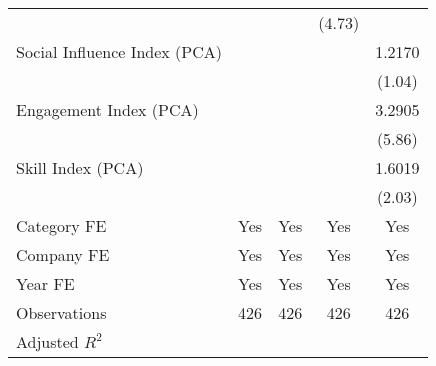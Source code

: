 {\begin{tabular}{l*{4}{c}}
                                   &                     &                     &      (4.73)         &                     \\
[1em]
Social Influence Index (PCA)       &                     &                     &                     &      1.2170         \\
                                   &                     &                     &                     &      (1.04)         \\
[1em]
Engagement Index (PCA)             &                     &                     &                     &      3.2905\sym{***}\\
                                   &                     &                     &                     &      (5.86)         \\
[1em]
Skill Index (PCA)                  &                     &                     &                     &      1.6019\sym{**} \\
                                   &                     &                     &                     &      (2.03)         \\
[1em]
Category FE                        &         Yes         &         Yes         &         Yes         &         Yes         \\
[1em]
Company FE                         &         Yes         &         Yes         &         Yes         &         Yes         \\
[1em]
Year FE                            &         Yes         &         Yes         &         Yes         &         Yes         \\
\hline
Observations                       &         426         &         426         &         426         &         426         \\
Adjusted \(R^{2}\)                 &                     &                     &                     &                     \\
\hline\hline
\end{tabular}
}
